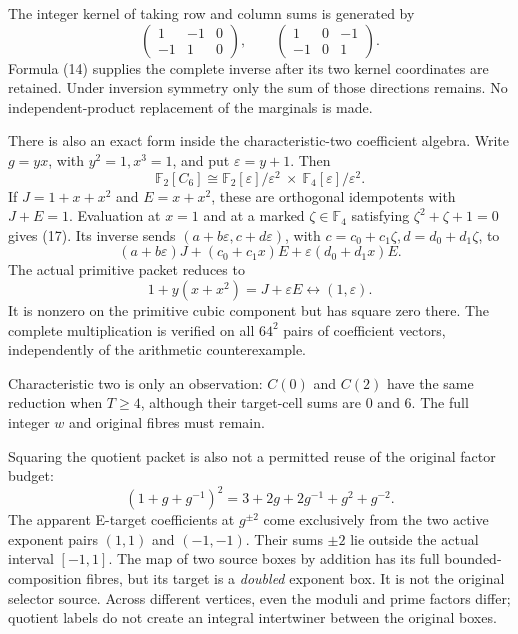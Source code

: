 The integer kernel of taking row and column sums is generated by
\[
 \begin{pmatrix}1&-1&0\\-1&1&0\end{pmatrix},\qquad
 \begin{pmatrix}1&0&-1\\-1&0&1\end{pmatrix}.               \tag{16}
\]
Formula (14) supplies the complete inverse after its two kernel coordinates are
retained. Under inversion symmetry only the sum of those directions remains.
No independent-product replacement of the marginals is made.

There is also an exact form inside the characteristic-two coefficient algebra.
Write $g=yx$, with $y^2=1,x^3=1$, and put $\varepsilon=y+1$. Then
\[
 \mathbb F_2[C_6]\cong
 \mathbb F_2[\varepsilon]/\varepsilon^2\ \times\
 \mathbb F_4[\varepsilon]/\varepsilon^2.                  \tag{17}
\]
If $J=1+x+x^2$ and $E=x+x^2$, these are orthogonal idempotents with $J+E=1$.
Evaluation at $x=1$ and at a marked $\zeta\in\mathbb F_4$ satisfying
$\zeta^2+\zeta+1=0$ gives (17). Its inverse sends
$(a+b\varepsilon,c+d\varepsilon)$, with
$c=c_0+c_1\zeta,d=d_0+d_1\zeta$, to
\[
 (a+b\varepsilon)J+(c_0+c_1x)E+\varepsilon(d_0+d_1x)E.
\]
The actual primitive packet reduces to
\[
 \boxed{1+y(x+x^2)=J+\varepsilon E\longleftrightarrow(1,\varepsilon).} \tag{18}
\]
It is nonzero on the primitive cubic component but has square zero there.
The complete multiplication is verified on all $64^2$ pairs of coefficient
vectors, independently of the arithmetic counterexample.

Characteristic two is only an observation: $C(0)$ and $C(2)$ have the same
reduction when $T\ge4$, although their target-cell sums are 0 and 6. The full
integer $w$ and original fibres must remain.

Squaring the quotient packet is also not a permitted reuse of the original
factor budget:
\[
 (1+g+g^{-1})^2=3+2g+2g^{-1}+g^2+g^{-2}.                 \tag{19}
\]
The apparent E-target coefficients at $g^{\pm2}$ come exclusively from the two
active exponent pairs $(1,1)$ and $(-1,-1)$. Their sums $\pm2$ lie outside the
actual interval $[-1,1]$. The map of two source boxes by addition has its full
bounded-composition fibres, but its target is a \emph{doubled} exponent box.
It is not the original selector source. Across different vertices, even the
moduli and prime factors differ; quotient labels do not create an integral
intertwiner between the original boxes.

